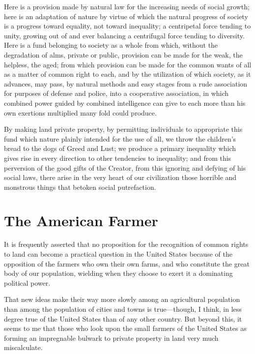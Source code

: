 \documentclass{book}
\begin{document}
Here is a provision made by natural law for the increasing needs of social growth; here is an adaptation of nature by virtue of which the natural progress of society is a progress toward equality, not toward inequality; a centripetal force tending to unity, growing out of and ever balancing a centrifugal force tending to diversity. Here is a fund belonging to society as a whole from which, without the degradation of alms, private or public, provision can be made for the weak, the helpless, the aged; from which provision can be made for the common wants of all as a matter of common right to each, and by the utilization of which society, as it advances, may pass, by natural methods and easy stages from a rude association for purposes of defense and police, into a cooperative association, in which combined power guided by combined intelligence can give to each more than his own exertions multiplied many fold could produce.

By making land private property, by permitting individuals to appropriate this fund which nature plainly intended for the use of all, we throw the children’s bread to the dogs of Greed and Lust; we produce a primary inequality which gives rise in every direction to other tendencies to inequality; and from this perversion of the good gifts of the Creator, from this ignoring and defying of his social laws, there arise in the very heart of our civilization those horrible and monstrous things that betoken social putrefaction.

\chapter{The American Farmer}
\label{chapter-20}
It is frequently asserted that no proposition for the recognition of common rights to land can become a practical question in the United States because of the opposition of the farmers who own their own farms, and who constitute the great body of our population, wielding when they choose to exert it a dominating political power.

That new ideas make their way more slowly among an agricultural population than among the population of cities and towns is true—though, I think, in less degree true of the United States than of any other country. But beyond this, it seems to me that those who look upon the small farmers of the United States as forming an impregnable bulwark to private property in land very much miscalculate.
\end{document}
